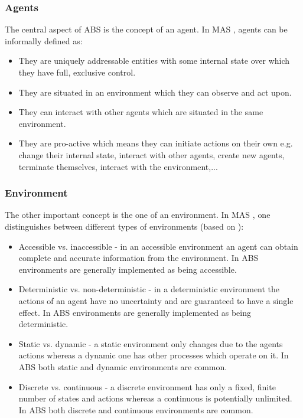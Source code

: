 \subsubsection{Agents}
The central aspect of ABS is the concept of an agent. In MAS \cite{wooldridge_introduction_2009}, \cite{weiss_multiagent_2013} agents can be informally defined as:

\begin{itemize}
	\item They are uniquely addressable entities with some internal state over which they have full, exclusive control.
	\item They are situated in an environment which they can observe and act upon.
	\item They can interact with other agents which are situated in the same environment.
	\item They are pro-active which means they can initiate actions on their own e.g. change their internal state, interact with other agents, create new agents, terminate themselves, interact with the environment,...
\end{itemize}

\subsubsection{Environment}
The other important concept is the one of an environment. In MAS \cite{wooldridge_introduction_2009}, \cite{weiss_multiagent_2013} one distinguishes between different types of environments (based on \cite{russell_artificial_2010}):

\begin{itemize}
	\item Accessible vs. inaccessible - in an accessible environment an agent can obtain complete and accurate information from the environment. In ABS environments are generally implemented as being accessible.
	\item Deterministic vs. non-deterministic - in a deterministic environment the actions of an agent have no uncertainty and are guaranteed to have a single effect. In ABS environments are generally implemented as being deterministic.
	\item Static vs. dynamic - a static environment only changes due to the agents actions whereas a dynamic one has other processes which operate on it. In ABS both static and dynamic environments are common.
	\item Discrete vs. continuous - a discrete environment has only a fixed, finite number of states and actions whereas a continuous is potentially unlimited. In ABS both discrete and continuous environments are common.
\end{itemize}

